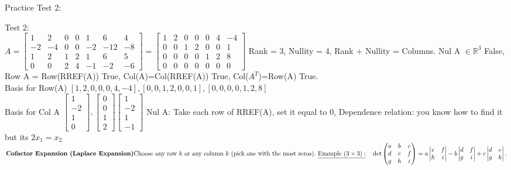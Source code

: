 \documentclass{article}
\begin{document}
\begin{multicols*}{2}
Practice Test 2:\\
\columnbreak

Test 2: \\
$A=\begin{bmatrix}1&2&0&0&1&6&4\\-2&-4&0&0&-2&-12&-8\\1&2&1&2&1&6&5 \\0&0&2&4&-1&-2&-6\end{bmatrix}=\begin{bmatrix}1&2&0&0&0&4&-4\\0&0&1&2&0&0&1\\0&0&0&0&1&2&8\\0&0&0&0&0&0&0\end{bmatrix}$
Rank = 3, Nullity = 4, Rank + Nullity = Columns. Nul A $\in \mathbb{R}^3$ False, Row A = Row(RREF(A)) True, Col(A)=Col(RREF(A)) True, Col($A^T$)=Row(A) True.
\\Basis for Row(A) $[1,2,0,0,0,4,-4],[0,0,1,2,0,0,1],[0,0,0,0,1,2,8]$ \\ Basis for Col A $\begin{bmatrix}1\\-2\\1\\0\end{bmatrix}, \begin{bmatrix}0\\0\\1\\2\end{bmatrix}\begin{bmatrix}1\\-2\\1\\-1\end{bmatrix}$ 
 Nul A: Take each row of RREF(A), set it equal to 0,
 Dependence relation: you know how to find it but its $2x_1=x_2$
 $
\textbf{Cofactor Expansion (Laplace Expansion)} \\
\text{Choose any row }k\text{ or any column }k\text{ (pick one with the most zeros).}\\[6pt]
\ \underline{\text{Example }(3\times3):}\quad\det\begin{pmatrix}a & b & c\\ d & e & f\\ g & h & i\end{pmatrix}= a\begin{vmatrix} e & f\\ h & i \end{vmatrix}- b\begin{vmatrix} d & f\\ g & i \end{vmatrix}+ c\begin{vmatrix} d & e\\ g & h \end{vmatrix}.$

\end{multicols*}
\end{document}
